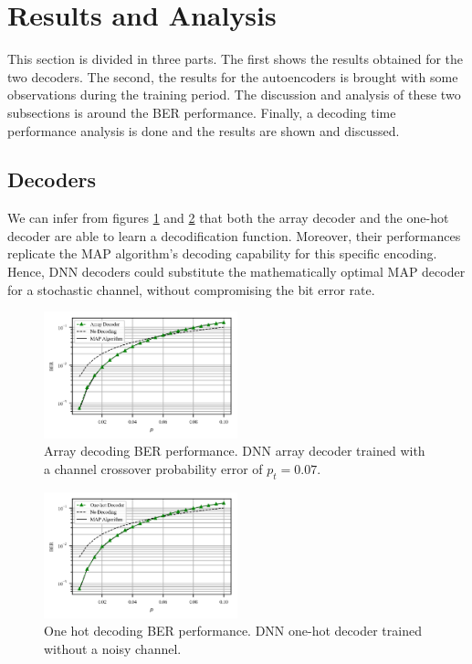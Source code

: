 \documentclass[conference]{IEEEtran}
\begin{document}
\section{Results and Analysis}

This section is divided in three parts. The first shows the results obtained for the two decoders. The second, the results for the autoencoders is brought with some observations during the training period. The discussion and analysis of these two subsections is around the BER performance. Finally, a decoding time performance analysis is done and the results are shown and discussed.

\subsection{Decoders}

We can infer from figures \ref{fig:ArrayD} and \ref{fig:1HD} that both the array decoder and the one-hot decoder are able to learn a decodification function. Moreover, their performances replicate the MAP algorithm's decoding capability for this specific encoding. Hence, DNN decoders could substitute the mathematically optimal MAP decoder for a stochastic channel, without compromising the bit error rate.

\begin{figure}[!ht]
  \centering
    \includegraphics[width=0.5\textwidth]{images/MLNN_Mep_65536_ptrain_007}
    \caption{Array decoding BER performance. DNN array decoder trained with a channel crossover probability error of $p_t=0.07$.}\label{fig:ArrayD}
\end{figure}

\begin{figure}[!ht]
  \centering
    \includegraphics[width=0.5\textwidth]{images/MLNN1H_Mep_16384_ptrain_0}
    \caption{One hot decoding BER performance. DNN one-hot decoder trained without a noisy channel.}\label{fig:1HD}
\end{figure}
\end{document}
